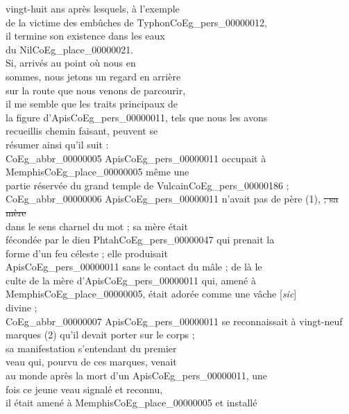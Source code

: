 \documentclass{book}
\begin{document}
{\begin{paracol}{2}
vingt-huit ans après lesquels, à l’exemple\\
de la victime des embûches de Typhon\gls{CoEg_pers_00000012},\\
il termine son existence dans les eaux\\
du Nil\gls{CoEg_place_00000021}.\\
\indent Si, arrivés au point où nous en\\
sommes, nous jetons un regard en arrière\\
sur la route que nous venons de parcourir,\\
il me semble que les traits principaux de\\
la figure d’Apis\gls{CoEg_pers_00000011}, tels que nous les avons\\
recueillis chemin faisant, peuvent se\\
résumer ainsi qu’il suit :\\
\indent \gls{CoEg_abbr_00000005} Apis\gls{CoEg_pers_00000011} occupait à Memphis\gls{CoEg_place_00000005} même une\\
partie réservée du grand temple de Vulcain\gls{CoEg_pers_00000186} ;\\
\indent \gls{CoEg_abbr_00000006} Apis\gls{CoEg_pers_00000011} n’avait pas de père (1), \sout{; sa mère}\\
dans le sens charnel du mot ; sa mère était\\
fécondée par le dieu Phtah\gls{CoEg_pers_00000047} qui prenait la\\
forme d’un feu céleste ; elle produisait\\
Apis\gls{CoEg_pers_00000011} sans le contact du mâle ; de là le\\
culte de la mère d’Apis\gls{CoEg_pers_00000011} qui, amené à\\
Memphis\gls{CoEg_place_00000005}, était adorée comme une vâche [\textit{sic}]\\
divine ;\\
\indent \gls{CoEg_abbr_00000007} Apis\gls{CoEg_pers_00000011} se reconnaissait à vingt-neuf\\
marques (2) qu’il devait porter sur le corps ;\\
sa manifestation s’entendant du premier\\
veau qui, pourvu de ces marques, venait\\
au monde après la mort d’un Apis\gls{CoEg_pers_00000011}, une\\
fois ce jeune veau signalé et reconnu,\\
il était amené à Memphis\gls{CoEg_place_00000005} et installé\\

\end{paracol}}
\end{document}
